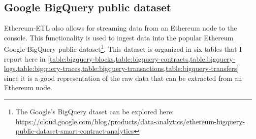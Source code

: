 \subsection{Google BigQuery public dataset}

\noindent Ethereum-ETL also allows for streaming data from an Ethereum node to the console. This functionality is used to ingest data into the popular Ethereum Google BigQuery public dataset\footnote{The Google's BigQuery dtaset can be explored here: \url{https://cloud.google.com/blog/products/data-analytics/ethereum-bigquery-public-dataset-smart-contract-analytics}}. This dataset is organized in six tables that I report here in \cref{table:bigquery-blocks,table:bigquery-contracts,table:bigquery-logs,table:bigquery-traces,table:bigquery-transactions,table:bigquery-transfers} since it is a good representation of the raw data that can be extracted from an Ethereum node.

